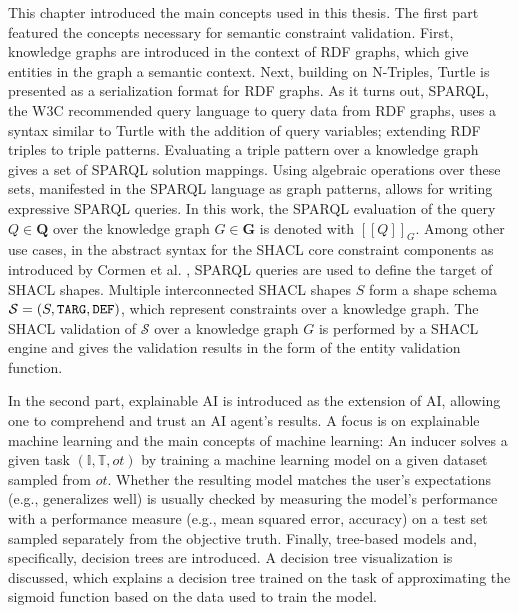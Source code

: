 This chapter introduced the main concepts used in this thesis. The first part featured the concepts necessary for semantic constraint validation. First, knowledge graphs are introduced in the context of RDF graphs, which give entities in the graph a semantic context. Next, building on N-Triples, Turtle is presented as a serialization format for RDF graphs. As it turns out, SPARQL, the W3C recommended query language to query data from RDF graphs, uses a syntax similar to Turtle with the addition of query variables; extending RDF triples to triple patterns. Evaluating a triple pattern over a knowledge graph gives a set of SPARQL solution mappings. Using algebraic operations over these sets, manifested in the SPARQL language as graph patterns, allows for writing expressive SPARQL queries. In this work, the SPARQL evaluation of the query $Q \in \mathbf{Q}$ over the knowledge graph $G \in \mathbf{G}$ is denoted with $[[Q]]_G$. Among other use cases, in the abstract syntax for the SHACL core constraint components as introduced by Cormen et al. \cite{corman2018semantics}, SPARQL queries are used to define the target of SHACL shapes. Multiple interconnected SHACL shapes $S$ form a shape schema $\mathcal{S} = (S,\texttt{TARG}, \texttt{DEF})$, which represent constraints over a knowledge graph. The SHACL validation of $\mathcal{S}$ over a knowledge graph $G$ is performed by a SHACL engine and gives the validation results in the form of the entity validation function. 

In the second part, explainable AI is introduced as the extension of AI, allowing one to comprehend and trust an AI agent's results. A focus is on explainable machine learning and the main concepts of machine learning: An inducer solves a given task $(\mathbb{I}, \mathbb{T}, ot)$ by training a machine learning model on a given dataset sampled from $ot$. Whether the resulting model matches the user's expectations (e.g., generalizes well) is usually checked by measuring the model's performance with a performance measure (e.g., mean squared error, accuracy) on a test set sampled separately from the objective truth. Finally, tree-based models and, specifically, decision trees are introduced. A decision tree visualization is discussed, which explains a decision tree trained on the task of approximating the sigmoid function based on the data used to train the model. 
